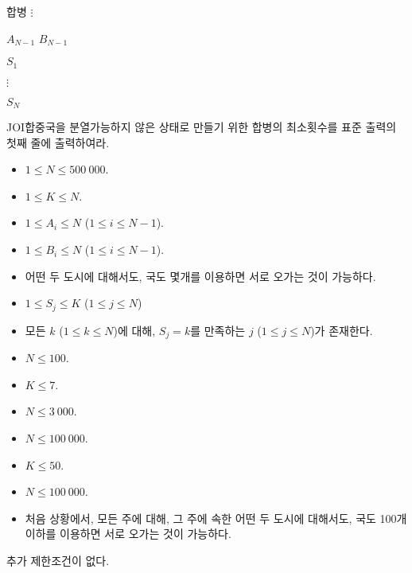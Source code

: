 \begin{problem}{합병}
	$\vdots$
	
	$A_{N-1}$ $B_{N-1}$
	
	$S_1$
	
	$\vdots$
	
	$S_N$
	
	\OutputFile
	
	JOI합중국을 분열가능하지 않은 상태로 만들기 위한 합병의 최소횟수를 표준 출력의 첫째 줄에 출력하여라.
		
	\Constraints
	
	\begin{itemize}
		\item $1 \le N \le 500\ 000$.
		\item $1 \le K \le N$.
		\item $1 \le A_i \le N$ ($1 \le i \le N-1$).
		\item $1 \le B_i \le N$ ($1 \le i \le N-1$).
		\item 어떤 두 도시에 대해서도, 국도 몇개를 이용하면 서로 오가는 것이 가능하다.
		\item $1 \le S_j \le K$ ($1 \le j \le N$)
		\item 모든 $k$ ($1 \le k \le N$)에 대해, $S_j = k$를 만족하는 $j$ ($1 \le j \le N$)가 존재한다.
	\end{itemize}
	
	
	\begin{itemize}
		\item $N \le 100$.
		\item $K \le 7$.
	\end{itemize}


	\begin{itemize}
		\item $N \le 3\ 000$.
	\end{itemize}

	\begin{itemize}
		\item $N \le 100\ 000$.
		\item $K \le 50$.
	\end{itemize}


	\begin{itemize}
		\item $N \le 100\ 000$.
		\item 처음 상황에서, 모든 주에 대해, 그 주에 속한 어떤 두 도시에 대해서도, 국도 100개 이하를 이용하면 서로 오가는 것이 가능하다.
	\end{itemize}

	추가 제한조건이 없다.
	

\end{problem}
